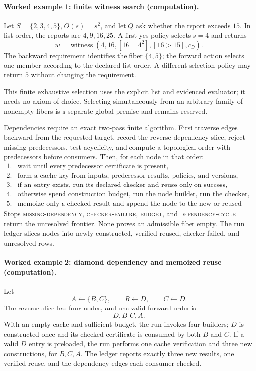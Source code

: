 \paragraph{Worked example 1: finite witness search (computation).}
Let \(S=\{2,3,4,5\}\), \(O(s)=s^2\), and let \(Q\) ask whether the report exceeds \(15\).  In list order, the reports
are \(4,9,16,25\).  A first-yes policy selects \(s=4\) and returns
\[
 w=\operatorname{witness}(4,16,[16=4^2],[16>15],c_D).
\]
The backward requirement identifies the fiber \(\{4,5\}\); the forward action selects one member according to the
declared list order.  A different selection policy may return \(5\) without changing the requirement.

This finite exhaustive selection uses the explicit list and evidenced evaluator; it needs no axiom of choice.  Selecting
simultaneously from an arbitrary family of nonempty fibers is a separate global premise and remains reserved.

Dependencies require an exact two-pass finite algorithm.  First traverse edges backward from the requested target,
record the reverse dependency slice, reject missing predecessors, test acyclicity, and compute a topological order with
predecessors before consumers.  Then, for each node in that order:
\[
\begin{array}{ll}
1.&\text{wait until every predecessor certificate is present},\\
2.&\text{form a cache key from inputs, predecessor results, policies, and versions},\\
3.&\text{if an entry exists, run its declared checker and reuse only on success},\\
4.&\text{otherwise spend construction budget, run the node builder, run the checker,}\\
5.&\text{memoize only a checked result and append the node to the new or reused slice.}
\end{array}
\]
Stops \textsc{missing-dependency}, \textsc{checker-failure}, \textsc{budget}, and \textsc{dependency-cycle} return the
unresolved frontier.  None proves an admissible fiber empty.  The run ledger slices nodes into newly constructed,
verified-reused, checker-failed, and unresolved rows.

\paragraph{Worked example 2: diamond dependency and memoized reuse (computation).}
Let
\[
 A\leftarrow\{B,C\},\qquad B\leftarrow D,\qquad C\leftarrow D.
\]
The reverse slice has four nodes, and one valid forward order is
\[
                              D,B,C,A.
\]
With an empty cache and sufficient budget, the run invokes four builders; \(D\) is constructed once and its checked
certificate is consumed by both \(B\) and \(C\).  If a valid \(D\) entry is preloaded, the run performs one cache
verification and three new constructions, for \(B,C,A\).  The ledger reports exactly three new results, one verified
reuse, and the dependency edges each consumer checked.

